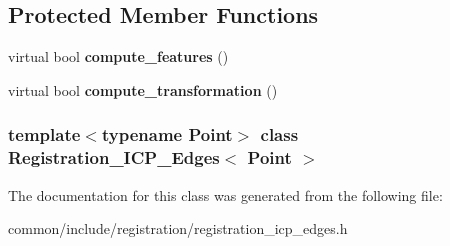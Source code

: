 \subsection*{Protected Member Functions}
\begin{DoxyCompactItemize}
\item 
\hypertarget{classRegistration__ICP__Edges_aa83ea33070108e6b9d78efaeb86e772c}{
virtual bool {\bfseries compute\_\-features} ()}
\label{classRegistration__ICP__Edges_aa83ea33070108e6b9d78efaeb86e772c}

\item 
\hypertarget{classRegistration__ICP__Edges_adab7fe49642c35cc9ebe416ab2e7cd63}{
virtual bool {\bfseries compute\_\-transformation} ()}
\label{classRegistration__ICP__Edges_adab7fe49642c35cc9ebe416ab2e7cd63}

\end{DoxyCompactItemize}
\subsubsection*{template$<$typename Point$>$ class Registration\_\-ICP\_\-Edges$<$ Point $>$}



The documentation for this class was generated from the following file:\begin{DoxyCompactItemize}
\item 
common/include/registration/registration\_\-icp\_\-edges.h\end{DoxyCompactItemize}

